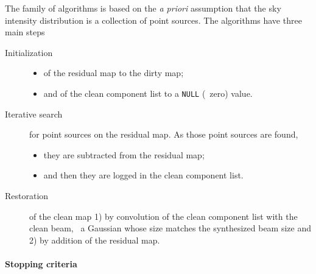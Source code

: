 The family of \clean{} algorithms is based on the \emph{a priori}
assumption that the sky intensity distribution is a collection of point
sources. The algorithms have three main steps
\begin{description}
\item[Initialization] \mbox{}
  \begin{itemize}
  \item of the residual map to the dirty map;
  \item and of the clean component list to a \texttt{NULL} (\ie\ zero)
    value.
  \end{itemize}
\item[Iterative search] for point sources on the residual map. As those
  point sources are found,
  \begin{itemize}
  \item they are subtracted from the residual map;
  \item and then they are logged in the clean component list.
  \end{itemize}
\item[Restoration] of the clean map 1) by convolution of the clean
  component list with the clean beam, \ie\ a Gaussian whose size matches
  the synthesized beam size and 2) by addition of the residual map.
\end{description}

\paragraph{Stopping criteria}


